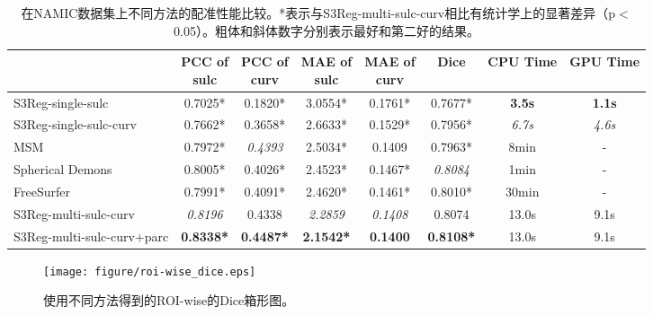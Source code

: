 \begin{table}[h]
		\caption{在NAMIC数据集上不同方法的配准性能比较。*表示与S3Reg-multi-sulc-curv相比有统计学上的显著差异（p$<$0.05）。粗体和斜体数字分别表示最好和第二好的结果。}
		\label{tab:NAMIC成人数据集的配准结果比较}
		\centering
		\begin{tabularx}{\linewidth}{l|c|c|c|c|c|c|c}
			\hline
			&       \makecell{PCC of\\ sulc}         &     \makecell{PCC of\\ curv}          &     \makecell{MAE of\\ sulc}  &         \makecell{MAE of\\ curv}     & Dice                     & CPU Time & GPU Time \\
			\hline
			S3Reg-single-sulc           &   0.7025*	        &   0.1820*	        &  3.0554*	       &  0.1761*	     &   0.7677*	        &    \textbf{3.5s} & \textbf{1.1s} \\
			S3Reg-single-sulc-curv      &	0.7662*	        &  0.3658*           &  	2.6633*         &   0.1529*	     &   0.7956*	        &   \textit{6.7s}  &\textit{4.6s}   \\
			MSM                         &	0.7972*	        &   \textit{0.4393}  &   2.5034*	       &   0.1409	     &   0.7963*	        &   8min           &  -            \\
			Spherical Demons	        &    0.8005*         &	0.4026*          &   	2.4523*	   &   0.1467*	     &   \textit{0.8084} &   1min           & -             \\
		   FreeSurfer     &    0.7991*         &	0.4091*          &   	2.4620*	   &   0.1461*    &   0.8010* &   30min       & -       \\
			S3Reg-multi-sulc-curv	    &   \textit{0.8196}	&   0.4338           &  	\textit{2.2859} & \textit{0.1408}	 &   0.8074	        &   13.0s          &   9.1s        \\
			S3Reg-multi-sulc-curv+parc	& 	\textbf{0.8338*}	& \textbf{0.4487*}	& \textbf{2.1542*}  & \textbf{0.1400}  & \textbf{0.8108*}  &   13.0s          &   9.1s        \\		
			\hline
		\end{tabularx}
\end{table}

\begin{figure}[h]
	\centering
	\texttt{[image: figure/roi-wise\_dice.eps]}
	\caption{使用不同方法得到的ROI-wise的Dice箱形图。}
	\label{fig:registration_roi_wise_dice}
\end{figure}

